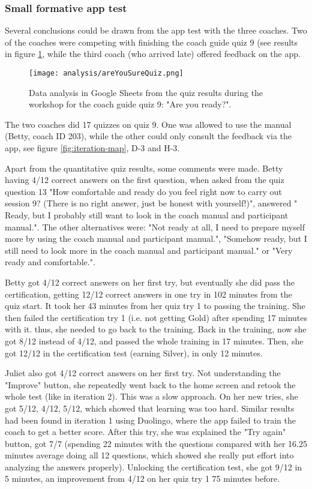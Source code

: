   \subsubsection{Small formative app test}

  Several conclusions could be drawn from the app test with the three coaches. Two of the coaches were competing with finishing the coach guide quiz 9 (see results in figure \ref{fig:areYouReady}, while the third coach (who arrived late) offered feedback on the app.

  \begin{figure}[h]
    \centering
    \texttt{[image: analysis/areYouSureQuiz.png]}
    \caption{Data analysis in Google Sheets from the quiz results during the workshop for the coach guide quiz 9: "Are you ready?".}
    \label{fig:areYouReady}
  \end{figure}

  The two coaches did 17 quizzes on quiz 9. One was allowed to use the manual (Betty, coach ID 203), while the other could only consult the feedback via the app, see figure \ref{fig:iteration-map}, D-3 and H-3.

  Apart from the quantitative quiz results, some comments were made. Betty having 4/12 correct answers on the first question, when asked from the quiz question 13 "How comfortable and ready do you feel right now to carry out session 9? (There is no right answer, just be honest with yourself!)", answered " Ready, but I probably still want to look in the coach manual and participant manual.". The other alternatives were: "Not ready at all, I need to prepare myself more by using the coach manual and participant manual.", "Somehow ready, but I still need to look more in the coach manual and participant manual." or "Very ready and comfortable.".

  Betty got 4/12 correct answers on her first try, but eventually she did pass the certification, getting 12/12 correct answers in one try in 102 minutes from the quiz start. It took her 43 minutes from her quiz try 1 to passing the training. She then failed the certification try 1 (i.e. not getting Gold) after spending 17 minutes with it. thus, she needed to go back to the training. Back in the training, now she got 8/12 instead of 4/12, and passed the whole training in 17 minutes. Then, she got 12/12 in the certification test (earning Silver), in only 12 minutes.

  Juliet also got 4/12 correct answers on her first try. Not understanding the "Improve" button, she repeatedly went back to the home screen and retook the whole test (like in iteration 2). This was a slow approach. On her new tries, she got 5/12, 4/12, 5/12, which showed that learning was too hard. Similar results had been found in iteration 1 using Duolingo, where the app failed to train the coach to get a better score. After this try, she was explained the "Try again" button, got 7/7 (spending 22 minutes with the questions compared with her 16.25 minutes average doing all 12 questions, which showed she really put effort into analyzing the answers properly). Unlocking the certification test, she got 9/12 in 5 minutes, an improvement from 4/12 on her quiz try 1 75 minutes before.

